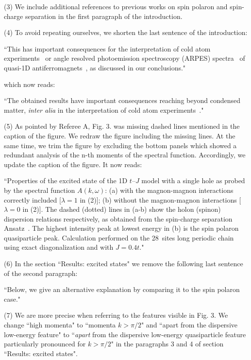 \documentclass[%
 manuscript,
 amsmath,amssymb,
 aps, onecolumn,
prl,
]{revtex4-1}
\begin{document}
(3) We include additional references to previous works on spin polaron and spin-charge separation in the first paragraph of the introduction.

(4) To avoid repeating ourselves, we shorten the last sentence of the introduction:

``This has important consequences for the interpretation of cold atom experiments~\cite{Bohrdt2021, Koepsell2021} or angle resolved photoemission spectroscopy (ARPES) spectra~\cite{Sobota2021} of quasi-1D antiferromagnets~\cite{Kim96, Kim06}, as discussed in our conclusions."

which now reads:

``The obtained results have important consequences reaching beyond condensed matter, {\it inter alia} in the interpretation of cold atom experiments~\cite{Bohrdt2021, Koepsell2021}."


(5) As pointed by Referee A, Fig. 3. was missing dashed lines mentioned in the caption of the figure. We redraw the figure including the missing lines. At the same time, we trim the figure by excluding the bottom panels which showed a redundant analysis of the n-th moments of the spectral function. Accordingly, we update the caption of the figure. It now reads:

``Properties of the excited state of the 1D $t$--$J$ model with a single hole as probed by the spectral function $A(k,\omega)$: (a) with the magnon-magnon interactions correctly included [$\lambda=1$ in (2)]; (b) without the magnon-magnon interactions [$\lambda=0$ in (2)]. The dashed (dotted) lines in (a-b) show the holon (spinon) dispersion relations respectively, as obtained from the spin-charge separation Ansatz~\cite{Ede97, Kim97}. The highest intensity peak at lowest energy in (b) is the spin polaron quasiparticle peak. Calculation performed on the 28~sites long periodic chain using exact diagonalization and with $J=0.4t$."

(6) In the section ``Results: excited states" we remove the following last sentence of the second paragraph:

``Below, we give an alternative explanation by comparing it to the spin polaron case." 

(7) We are more precise when referring to the features visible in Fig. 3. We change ``high momenta" to ``momenta $k> \pi/2$" and ``apart from the dispersive low-energy feature" to ``{\it apart} from the dispersive low-energy quasiparticle feature particularly pronounced for $k> \pi/2$" in the paragraphs 3 and 4 of section ``Results: excited states".
\end{document}
